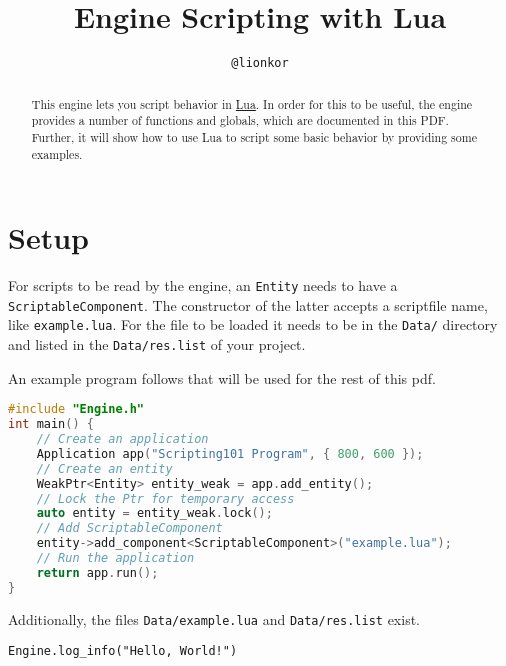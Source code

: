\documentclass[12pt,a4paper]{article}
\title{Engine Scripting with Lua}
\author{\texttt{@lionkor}}
\begin{document}
\begin{titlepage}
\clearpage\maketitle
\thispagestyle{empty}
\end{titlepage}


\tableofcontents
\pagebreak

\begin{abstract}
This engine lets you script behavior in \href{https://www.lua.org/about.html}{Lua}. 
In order for this to be useful, the engine provides a number of functions and globals, which are documented in this PDF. Further, it will show how to use Lua to script some basic behavior by providing some examples.

\end{abstract}

\pagebreak

\setcounter{page}{1}

\section{Setup}

For scripts to be read by the engine, an \texttt{Entity} needs to have a  \texttt{ScriptableComponent}. The constructor of the latter accepts a scriptfile name, like \texttt{example.lua}. For the file to be loaded it needs to be in the \texttt{Data/} directory and listed in the \texttt{Data/res.list} of your project.

An example program follows that will be used for the rest of this pdf.

\begin{lstlisting}[language=C++,title=example.cpp]
#include "Engine.h"
int main() {
	// Create an application
	Application app("Scripting101 Program", { 800, 600 });
	// Create an entity
	WeakPtr<Entity> entity_weak = app.add_entity();
	// Lock the Ptr for temporary access
	auto entity = entity_weak.lock();
	// Add ScriptableComponent
	entity->add_component<ScriptableComponent>("example.lua");
	// Run the application
	return app.run();
}
\end{lstlisting}

Additionally, the files \texttt{Data/example.lua} and \texttt{Data/res.list} exist.

\begin{lstlisting}[language={[5.0]Lua},title=Data/example.lua]
Engine.log_info("Hello, World!")
\end{lstlisting}
\end{document}
